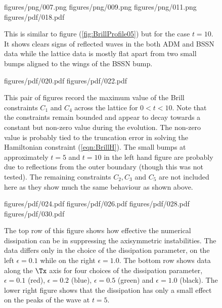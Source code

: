 \documentclass[a4paper,12pt]{article}
\numberwithin{equation}{section}
\begin{document}
\begin{figure}[!ht]
\FigPair%
{figures/png/007.png}{\mywd}%
{figures/png/009.png}{\mywd}%
\FigPair%
{figures/png/011.png}{\mywd}%
{figures/pdf/018.pdf}{\mywd}%
\caption{This is similar to figure (\ref{fig:BrillProfile05}) but for the
case $t=10$. It shows clears signs of reflected waves in the both ADM and
BSSN data while the lattice data is mostly flat apart from two small bumps
aligned to the wings of the BSSN bump.}
\label{fig:BrillProfile10}
\end{figure}

\begin{figure}[!ht]
\FigPair%
{figures/pdf/020.pdf}{\mywd}%
{figures/pdf/022.pdf}{\mywd}%
\caption{This pair of figures record the maximum value of the Brill
constraints $C_1$ and $C_4$ across the lattice for $0<t<10$. Note that the
constraints remain bounded and appear to decay towards a constant but
non-zero value during the evolution. The non-zero value is probably tied to
the truncation error in solving the Hamiltonian constraint
(\ref{eqn:BrillH}). The small bumps at approximately $t=5$ and $t=10$ in the
left hand figure are probably due to reflections from the outer boundary
(though this was not tested). The remaining constraints $C_2,C_3$ and $C_5$
are not included here as they show much the same behaviour as shown above.}
\label{fig:BrillConstC1C4}
\end{figure}

\begin{figure}[!ht]
\FigPair%
{figures/pdf/024.pdf}{\mywd}%
{figures/pdf/026.pdf}{\mywd}%
\FigPair%
{figures/pdf/028.pdf}{\mywd}%
{figures/pdf/030.pdf}{\mywd}%
\caption{The top row of this figure shows how effective the numerical
dissipation can be in suppressing the axisymmetric instabilities. The data
differs only in the choice of the dissipation parameter, on the left
$\epsilon=0.1$ while on the right $\epsilon=1.0$. The bottom row shows
data along the $\Tx$ axis for four choices of the dissipation parameter,
$\epsilon=0.1$ (red), $\epsilon=0.2$ (blue), $\epsilon=0.5$ (green) and
$\epsilon=1.0$ (black). The lower right figure shows that the dissipation has
only a small effect on the peaks of the wave at $t=5$.}
\label{fig:BrillDissip}
\end{figure}
\end{document}
